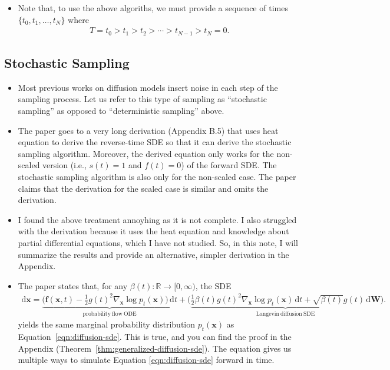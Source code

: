 \documentclass[10pt]{article}
\newcommand{\dee}{\mathrm{d}}
\newcommand{\ve}[1]{\mathbf{#1}}
\newcommand{\Real}{\mathbb{R}}
\begin{document}
\begin{itemize}
  \item Note that, to use the above algoriths, we must provide a sequence of times $\{ t_0, t_1, \dotsc, t_N \}$ where
  \begin{align*}
    T = t_0 > t_1 > t_2 > \dotsb > t_{N-1} > t_N = 0.
  \end{align*}
\end{itemize}

\subsection{Stochastic Sampling}

\begin{itemize}
  \item Most previous works on diffusion models insert noise in each step of the sampling process. Let us refer to this type of sampling as ``stochastic sampling'' as opposed to ``deterministic sampling'' above.

  \item The paper goes to a very long derivation (Appendix B.5) that uses heat equation to derive the reverse-time SDE \cite{Anderson:1982} so that it can derive the stochastic sampling algorithm. Moreover, the derived equation only works for the non-scaled version (i.e., $s(t) = 1$ and $f(t) = 0$) of the forward SDE. The stochastic sampling algorithm is also only for the non-scaled case. The paper claims that the derivation for the scaled case is similar and omits the derivation.
  
  \item I found the above treatment annoyhing as it is not complete. I also struggled with the derivation because it uses the heat equation and knowledge about partial differential equations, which I have not studied. So, in this note, I will summarize the results and provide an alternative, simpler derivation in the Appendix.  

  \item The paper states that, for any $\beta(t): \Real \rightarrow [0,\infty)$, the SDE
  \begin{align}
    \dee\ve{x} = \underbrace{\bigg( \ve{f}(\ve{x},t) - \frac{1}{2}g(t)^2 \nabla_{\ve{x}} \log p_t(\ve{x}) \bigg)\, \dee t}_{\mathrm{probability\ flow\ ODE}} +  \bigg( \underbrace{\frac{1}{2} \beta(t) g(t)^2 \nabla_{\ve{x}} \log p_t(\ve{x})\, \dee t + \sqrt{\beta(t)} g(t)\, \dee \ve{W}}_{\mathrm{Langevin\ diffusion\ SDE}} \bigg). \label{eqn:generalized-diffusion-sde}
  \end{align}
  yields the same marginal probability distribution $p_t(\ve{x})$ as Equation~\ref{eqn:diffusion-sde}. This is true, and you can find the proof in the Appendix (Theorem~\ref{thm:generalized-diffusion-sde}). The equation gives us multiple ways to simulate Equation \eqref{eqn:diffusion-sde} forward in time.
  

\end{itemize}
\end{document}
